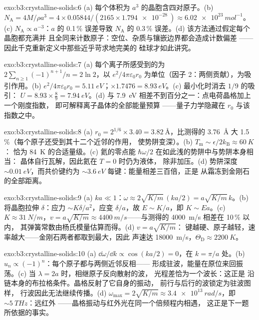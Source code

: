 \begin{solution}{exo:b3:crystalline-solids:6}
(a) 每个体积为 $a^3$ 的晶胞含四对原子。(b) $N_{\text{A}} =
4M/\rho a^3 = 4\times0.05844/(2165\times\qty{1.794e-28}{})
\approx \qty{6.02e23}{mol^{-1}}$。(c) $N_{\text{A}} \propto
a^{-3}$：$a$ 的 0.1\,\% 误差导致 $N_{\text{A}}$ 的 0.3\,\% 误差。(d)
该方法通过假定每个晶胞都充满并
且全同来计数原子：空位、杂质与镶嵌边界都会造成计数偏差
——因此千克重新定义中那些近乎苛求地完美的
硅球才如此讲究。
\end{solution}

\begin{solution}{exo:b3:crystalline-solids:7}
(a) 每个离子所感受到的为 $2\sum_{n\ge1}(-1)^{n+1}/n = 2\ln2$，以
$e^2/4\pi\varepsilon_0r_0$ 为单位（因子 2：两侧贡献），为吸引作用。(b)
$e^2/4\pi\varepsilon_0r_0 = \qty{5.11}{eV}$；$\times1.7476 =
\qty{8.93}{eV}$。(c) 最小化时消去 $1/9$ 的吸引：
$U = 8.93\times\tfrac89 = \qty{7.94}{eV}$。(d) 与
\qty{7.9}{eV} 相差不到百分之一：点电荷晶格加上一个刚度指数，
即可解释离子晶体的全部能量预算
——量子力学隐藏在 $r_0$ 与该指数之中。
\end{solution}

\begin{solution}{exo:b3:crystalline-solids:8}
(a) $r_0 = 2^{1/6}\times3.40 = \qty{3.82}{\angstrom}$，比测得的
\qty{3.76}{\angstrom} 大 1.5\,\%（每个原子还受到其十二个近邻的作用，
使势阱变深）。(b)
$T_{\text{m}} \sim \epsilon/2k_{\text{B}} \approx \qty{60}{K}$：
恰为 \qty{84}{K} 的合适量级。(c) 氦的零点能
$\hbar\omega/2$ 在如此浅的势阱中与势阱本身相当：
晶体自行瓦解，因此氦在 $T = 0$ 时仍为液体，
除非加压。(d) 势阱深度 $\sim\qty{0.01}{eV}$，而共价键约为
$\sim\qty{3.6}{eV}$ 每键：能量相差三百倍，正是
从霜冻到金刚石的全部距离。
\end{solution}

\begin{solution}{exo:b3:crystalline-solids:9}
(a) $ka \ll 1$：$\omega \approx 2\sqrt{K/m}\,(ka/2) =
a\sqrt{K/m}\,k$。(b) 将晶胞拉伸 $\delta$：应力 $\sim
K\delta/a^2$，应变 $\delta/a$，故 $E \sim K/a$，即 $K \sim
Ea$。(c) $K \approx \qty{31}{N/m}$，$v = a\sqrt{K/m} \approx
\qty{4400}{m/s}$——与测得的 \qty{4000}{m/s} 相差在 10\,\% 以内，
其弹簧常数由杨氏模量估算而得。(d) $v = a\sqrt{K/m}$：
键越硬、原子越轻，速率越大——金刚石两者都取到最大，因此
声速达 \qty{18000}{m/s}，$\Theta_{\text{D}} \approx
\qty{2200}{K}$。
\end{solution}

\begin{solution}{exo:b3:crystalline-solids:10}
(a) $\dd\omega/\dd k \propto \cos(ka/2) = 0$，在 $k = \pi/a$ 处。(b)
$u_n \propto (-1)^n$：每个原子都与两侧近邻反相——
形成驻波，能量在原位来回振荡。(c)
当 $\lambda = 2a$ 时，相继原子反向散射的波，
光程差恰为一个波长：这正是
沿链本身的布拉格条件。晶格反射了它自身的振动，
前行与后行的波锁定为驻波图样，
行波因此无法继续传播。(d) $\omega_{\text{max}} = 2\sqrt{K/m} \approx
\qty{3.4e13}{rad/s}$，即 $\sim\qty{5}{THz}$：远红外
——晶格振动与红外光在同一个倍频程内相遇，
这正是下一题所依据的事实。
\end{solution}

